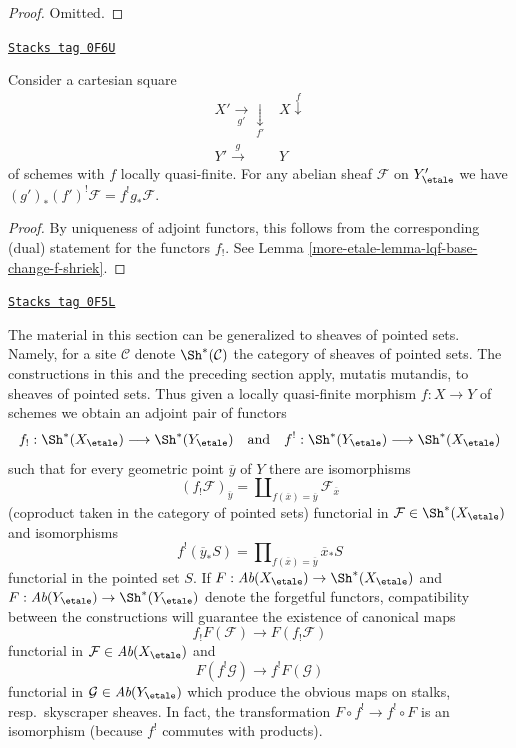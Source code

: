 \begin{proof}
Omitted.
\end{proof}

\begin{lemma}
\label{more-etale-lemma-lqf-base-change-upper-shriek}
\href{https://stacks.math.columbia.edu/tag/0F6U}{\texttt{Stacks tag 0F6U}}

Consider a cartesian square
$$
\begin{array}{cc}X' \underset{g'}{\longrightarrow}\underset{f'}{\downarrow} & X \overset{f}{\downarrow} \\ Y' \overset{g}{\longrightarrow} & Y\end{array}
$$
of schemes with $f$ locally quasi-finite. For any abelian sheaf $\mathcal{F}$
on $Y'_\etale$ we have $(g')_*(f')^!\mathcal{F} = f^!g_*\mathcal{F}$.
\end{lemma}

\begin{proof}
By uniqueness of adjoint functors, this follows from
the corresponding (dual) statement for the functors $f_!$.
See Lemma \ref{more-etale-lemma-lqf-base-change-f-shriek}.
\end{proof}

\begin{remark}
\label{more-etale-remark-pointed-sets}
\href{https://stacks.math.columbia.edu/tag/0F5L}{\texttt{Stacks tag 0F5L}}

The material in this section can be generalized to sheaves of pointed sets.
Namely, for a site $\mathcal{C}$ denote $\Sh^*(\mathcal{C})$ the category of
sheaves of pointed sets. The constructions in this and the preceding section
apply, mutatis mutandis, to sheaves of pointed sets. Thus given a locally
quasi-finite morphism $f : X \to Y$ of schemes we obtain
an adjoint pair of functors
$$
f_! : \Sh^*(X_\etale) \longrightarrow \Sh^*(Y_\etale)
\quad\text{and}\quad
f^! : \Sh^*(Y_\etale) \longrightarrow \Sh^*(X_\etale)
$$
such that for every geometric point $\overline{y}$ of $Y$ there are
isomorphisms
$$
(f_!\mathcal{F})_{\overline{y}} =
\coprod\nolimits_{f(\overline{x}) = \overline{y}}
\mathcal{F}_{\overline{x}}
$$
(coproduct taken in the category of pointed sets) functorial in
$\mathcal{F} \in \Sh^*(X_\etale)$ and isomorphisms
$$
f^!(\overline{y}_*S) =
\prod\nolimits_{f(\overline{x}) = \overline{y}}
\overline{x}_*S
$$
functorial in the pointed set $S$. If
$F : \textit{Ab}(X_\etale) \to \Sh^*(X_\etale)$ and
$F : \textit{Ab}(Y_\etale) \to \Sh^*(Y_\etale)$
denote the forgetful functors, compatibility between the constructions
will guarantee the existence of canonical maps
$$
f_!F(\mathcal{F}) \longrightarrow F(f_!\mathcal{F})
$$
functorial in $\mathcal{F} \in \textit{Ab}(X_\etale)$ and
$$
F(f^!\mathcal{G}) \longrightarrow f^!F(\mathcal{G})
$$
functorial in $\mathcal{G} \in \textit{Ab}(Y_\etale)$
which produce the obvious maps on stalks, resp.\ skyscraper sheaves.
In fact, the transformation $F \circ f^! \to f^! \circ F$ is an isomorphism
(because $f^!$ commutes with products).
\end{remark}


